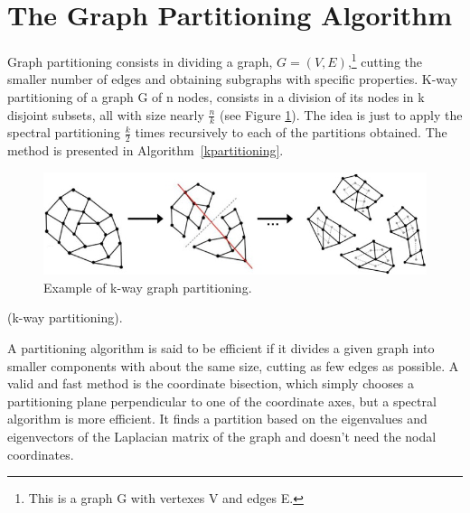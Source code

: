 \documentclass[]{usiinfbachelorproject}
\makeatletter
\def\BState{\State\hskip-\ALG@thistlm}
\makeatother
\begin{document}
\section{The Graph Partitioning Algorithm} \label{sec:graphpart} 
Graph partitioning consists in dividing a graph, $G=(V,E)$,\footnote{This is a graph G with vertexes V and edges E.} cutting the smaller number of edges and obtaining subgraphs with specific properties. K-way partitioning of a graph G of n nodes, consists in a division of its nodes in k disjoint subsets, all with size nearly $\frac{n}{k}$ (see Figure \ref{fig:kpartitioning}). The idea is just to apply the spectral partitioning $\frac{k}{2}$ times recursively to each of the partitions obtained. The method is presented in Algorithm~\ref{kpartitioning}.

\begin{figure}[ht]
	\centering
	\includegraphics[height=3cm]{img/k_way_partitioning.jpg}
	\caption{Example of k-way graph partitioning.}
	\label{fig:kpartitioning}
\end{figure}

\begin{algorithm}
\caption{ (k-way partitioning).}\label{kpartitioning}
\end{algorithm}

A partitioning algorithm is said to be efficient if it divides a given graph into smaller components with about the same size, cutting as few edges as possible. 
A valid and fast method is the coordinate bisection, which simply chooses a partitioning plane perpendicular to one of the coordinate axes, but a spectral algorithm is more efficient. It finds a partition based on the eigenvalues and eigenvectors of the Laplacian matrix of the graph and doesn't need the nodal coordinates.
\end{document}
